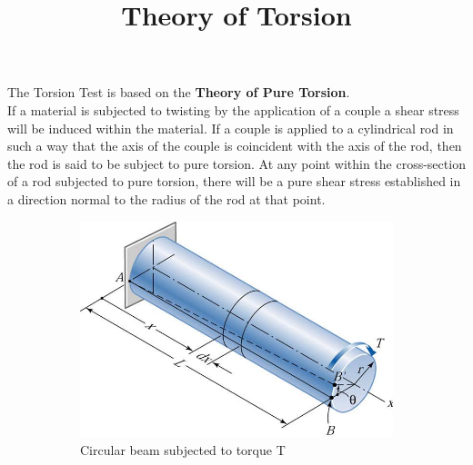 \documentclass[12pt,a4paper]{article}	%
\title{Theory of Torsion}
\date{\vspace{-5ex}}	%
\begin{document}
\maketitle
The Torsion Test is based on the \textbf{Theory of Pure Torsion}.\\

If a material is subjected to twisting by the application of a couple a shear stress will be induced within the material. If a couple is applied to a cylindrical rod in such a way that the axis of the couple is coincident with the axis of the rod, then the rod is said to be subject to pure torsion. At any point within the cross-section of a rod subjected to pure torsion, there will be a pure shear stress established in a direction normal to the radius of the rod at that point.\\
	\begin{figure}[h!]
	\centering
	\begin{subfigure}[b]{0.5\linewidth}
		\includegraphics[width=\linewidth]{Ok.png}
		\caption{Circular beam subjected to torque T}
	\end{subfigure} \hspace{10mm}%
	\begin{subfigure}[b]{0.4\linewidth}

\end{subfigure}
\end{figure}
\end{document}
